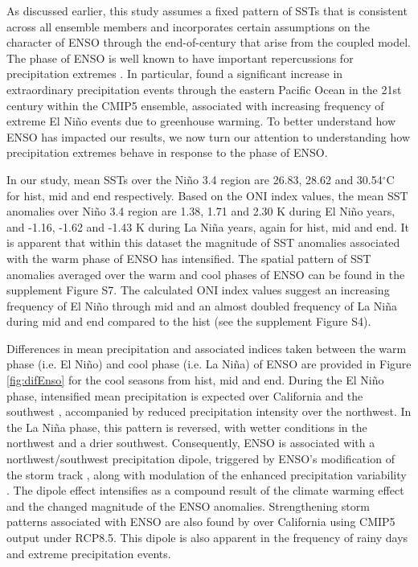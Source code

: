 \documentclass{ametsoc}
\begin{document}
As discussed earlier, this study assumes a fixed pattern of SSTs that is consistent across all ensemble members and incorporates certain assumptions on the character of ENSO through the end-of-century that arise from the coupled model. The phase of ENSO is well known to have important repercussions for precipitation extremes \citep{larkin2005definition, allan2008atmospheric, maloney2014north, yoon2015increasing}. In particular, \cite{cai2014increasing} found a significant increase in extraordinary precipitation events through the eastern Pacific Ocean in the 21st century within the CMIP5 ensemble, associated with increasing frequency of extreme El Ni\~no events due to greenhouse warming.  To better understand how ENSO has impacted our results, we now turn our attention to understanding how precipitation extremes behave in response to the phase of ENSO.


In our study, mean SSTs over the Ni\~no 3.4 region are 26.83, 28.62 and 30.54$^\circ$C for \textsf{hist}, \textsf{mid} and \textsf{end} respectively. Based on the ONI index values, the mean SST anomalies over Ni\~no 3.4 region are 1.38, 1.71 and 2.30 K during El Ni\~no years, and -1.16, -1.62 and -1.43 K during La Ni\~na years, again for \textsf{hist}, \textsf{mid} and \textsf{end}. It is apparent that within this dataset the magnitude of SST anomalies associated with the warm phase of ENSO has intensified. The spatial pattern of SST anomalies averaged over the warm and cool phases of ENSO can be found in the supplement Figure S7. The calculated ONI index values suggest an increasing frequency of El Ni\~no through \textsf{mid} and an almost doubled frequency of La Ni\~na during \textsf{mid} and \textsf{end} compared to the \textsf{hist} (see the supplement Figure S4).


Differences in mean precipitation and associated indices taken between the warm phase (i.e. El Ni\~no) and cool phase (i.e. La Ni\~na) of ENSO are provided in Figure \ref{fig:difEnso} for the cool seasons from \textsf{hist}, \textsf{mid} and \textsf{end}.  During the El Ni\~no phase, intensified mean precipitation is expected over California and the southwest \citep{hamlet2007effects}, accompanied by reduced precipitation intensity over the northwest. In the La Ni\~na phase, this pattern is reversed, with wetter conditions in the northwest and a drier southwest. Consequently, ENSO is associated with a northwest/southwest precipitation dipole, triggered by ENSO's modification of the storm track \citep{gershunov1998interdecadal, leung2003hydroclimate}, along with modulation of the enhanced precipitation variability \citep{cayan1999enso, kahya1994influences}. The dipole effect intensifies as a compound result of the climate warming effect and the changed magnitude of the ENSO anomalies. Strengthening storm patterns associated with ENSO are also found by \cite{maloney2014north} over California using CMIP5 output under RCP8.5.  This dipole is also apparent in the frequency of rainy days and extreme precipitation events. 
\end{document}
